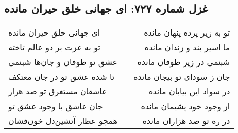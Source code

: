 \begin{center}
\section*{غزل شماره ۷۲۷: ای جهانی خلق حیران مانده}
\label{sec:727}
\begin{longtable}{l p{0.5cm} r}
ای جهانی خلق حیران مانده
&&
تو به زیر پرده پنهان مانده
\\
تو به عزت بر دو عالم تاخته
&&
ما اسیر بند و زندان مانده
\\
عشق تو طوفان و جان‌ها شبنمی
&&
شبنمی در زیر طوفان مانده
\\
تا شده عشق تو در جان معتکف
&&
جان ز سودای تو بیجان مانده
\\
عاشقان مستغرق تو صد هزار
&&
در سواد این بیابان مانده
\\
جان عاشق با وجود عشق تو
&&
از وجود خود پشیمان مانده
\\
همچو عطار آتشین‌دل خون‌فشان
&&
در ره تو صد هزاران مانده
\\
\end{longtable}
\end{center}
